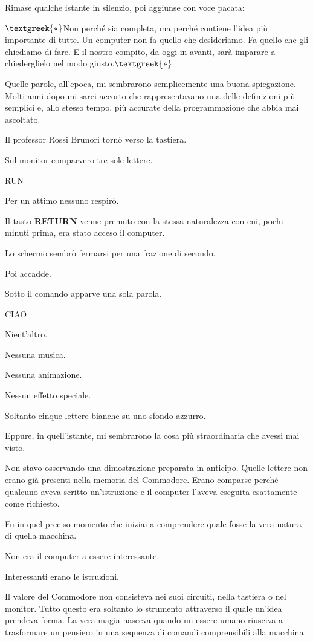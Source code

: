 \documentclass{article}
\begin{document}
Rimase qualche istante in silenzio, poi aggiunse con voce pacata:

$\text{\textgreek{«}}$Non perché sia completa, ma perché contiene l'idea più importante di tutte. Un computer non fa
quello che desideriamo. Fa quello che gli chiediamo di fare. E il nostro compito, da oggi in avanti, sarà imparare a
chiederglielo nel modo giusto.$\text{\textgreek{»}}$

Quelle parole, all'epoca, mi sembrarono semplicemente una buona spiegazione. Molti anni dopo mi sarei accorto che
rappresentavano una delle definizioni più semplici e, allo stesso tempo, più accurate della programmazione che abbia
mai ascoltato.

Il professor Rossi Brunori tornò verso la tastiera.

Sul monitor comparvero tre sole lettere.

RUN

Per un attimo nessuno respirò.

Il tasto \textbf{RETURN} venne premuto con la stessa naturalezza con cui, pochi minuti prima, era stato acceso il
computer.

Lo schermo sembrò fermarsi per una frazione di secondo.

Poi accadde.

Sotto il comando apparve una sola parola.

CIAO

Nient'altro.

Nessuna musica.

Nessuna animazione.

Nessun effetto speciale.

Soltanto cinque lettere bianche su uno sfondo azzurro.

Eppure, in quell'istante, mi sembrarono la cosa più straordinaria che avessi mai visto.

Non stavo osservando una dimostrazione preparata in anticipo. Quelle lettere non erano già presenti nella memoria del
Commodore. Erano comparse perché qualcuno aveva scritto un'istruzione e il computer l'aveva eseguita esattamente come
richiesto.

Fu in quel preciso momento che iniziai a comprendere quale fosse la vera natura di quella macchina.

Non era il computer a essere interessante.

Interessanti erano le istruzioni.

Il valore del Commodore non consisteva nei suoi circuiti, nella tastiera o nel monitor. Tutto questo era soltanto lo
strumento attraverso il quale un'idea prendeva forma. La vera magia nasceva quando un essere umano riusciva a
trasformare un pensiero in una sequenza di comandi comprensibili alla macchina.
\end{document}
